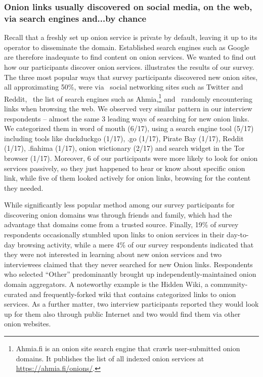 \subsubsection{Onion links usually discovered on social media, on the web, via search engines and...by chance }
Recall that a freshly set up onion service is private by default, leaving it up
to its operator to disseminate the domain.  Established search engines such as
Google are therefore inadequate to find content on onion services.  We wanted to
find out how our participants discover onion services.
 illustrates the results of our survey.  The three most popular ways
that survey participants discovered new onion sites, all approximating 50\%, were via \first~social
networking sites such as Twitter and Reddit, \second~the list of search engines
such as Ahmia,\footnote{Ahmia.fi is an onion site search engine that crawls
user-submitted onion domains.  It publishes the list of all indexed onion
services at \url{https://ahmia.fi/onions/}.} and \third~randomly encountering
links when browsing the web. 
We observed very similar pattern in our interview respondents – almost the same 3 leading ways of searching for new onion links.  We categorized them in word of mouth (6/17), using a search engine tool (5/17) including tools like duckduckgo (1/17), .go (1/17), Pirate Bay (1/17), Reddit (1/17), .fiahima (1/17), onion wictionary (2/17) and search widget in the Tor browser (1/17). Moreover, 6 of our participants were more likely to look for onion services passively, so they just happened to hear or know about specific onion link, while five of them looked actively for onion links, browsing for the content they needed.

While significantly less popular method among our survey participants for discovering onion domains was through friends and
family, which had the advantage that domains come from a trusted source. 
Finally, 19\% of survey respondents occasionally
stumbled upon links to onion services in their day-to-day browsing activity, while
a mere
4\% of our survey respondents indicated that they were not interested in learning about new onion services and two interviewees claimed that they never searched for new Onion links.
Respondents who selected ``Other'' predominantly brought up
independently-maintained onion domain aggregators.  A noteworthy example is the
Hidden Wiki, a community-curated and frequently-forked wiki that contains
categorized links to onion services.  As a further matter, two interview participants reported they would look up for them also through public Internet and two would find them via other onion websites.


